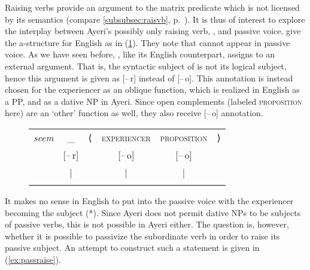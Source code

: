 Raising verbs provide an argument to the matrix predicate which is not licensed
by its semantics (compare \autoref{subsubsec:raisvb},
p.~\pageref{subsubsec:raisvb}). It is thus of interest to explore the interplay
between Ayeri's possibly only raising verb, , and
passive voice. \citet{bresnan2016} give the a-structure for English
 as in (\ref{ex:engseemastruct}). They note that  cannot
appear in passive voice. As we have seen before, , like
its English counterpart, assigns \Subj{} to an external argument. That is, the
syntactic subject of  is not its logical subject, hence this argument
is given as [–\,r] instead of [–\,o]. This annotation is instead chosen for the
experiencer as an oblique function, which is realized in English as a PP, and
as a dative NP in Ayeri. Since open complements (labeled \textsc{proposition} here)
are an `other' function as well, they also receive [–\,o] annotation.

\begin{figure}[h]
\ex\label{ex:engseemastruct}
\begin{tabular}[t]{@{} >{\itshape}l c l c c r}
seem
	& \_
	& ⟨
	& \textsc{experiencer}
	& \textsc{proposition}
	& ⟩
	\\
%
	& [–\,r]
	& %
	& [–\,o]
	& [–\,o]
	& %
	\\

%
	& |
	& %
	& |
	& |
	& %
	\\

%
	& \Subj
	& %
	& \Oblq{exp}
	& \XCompl
	& %
	\\
\end{tabular}

\xe
\end{figure}

It makes no sense in English to put  into the passive voice with the
experiencer becoming the subject (*). Since Ayeri does not
permit dative NPs to be subjects of passive verbs, this is not possible in
Ayeri either. The question is, however, whether it is possible to passivize the
subordinate verb in order to raise its passive subject. An attempt to construct
such a statement is given in (\ref{ex:passraise}).

